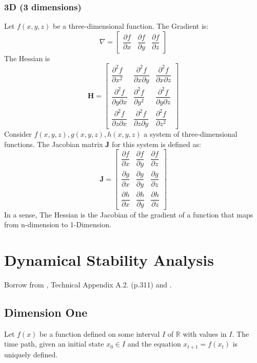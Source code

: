 \documentclass[11pt,a4paper]{book}
\theoremstyle{definition}\newtheorem{definition}{Definition}
\theoremstyle{definition}\newtheorem{fact}{Fact}
\theoremstyle{definition}\newtheorem{remark}{Remark}
\theoremstyle{definition}\newtheorem{ex}{Ex.}
\theoremstyle{definition}\newtheorem{project}{Project}
\theoremstyle{definition}\newtheorem{problem}{Problem}
\theoremstyle{definition}\newtheorem{example}{Example}
\numberwithin{theorem}{section}
\numberwithin{corollary}{chapter}
\numberwithin{assumption}{chapter}
\numberwithin{definition}{chapter}
\numberwithin{prop}{chapter}
\numberwithin{notation}{chapter}
\numberwithin{problem}{chapter}
\numberwithin{example}{chapter}
\numberwithin{fact}{chapter}
\numberwithin{ex}{chapter}
\def\R{\mathbb R}
\def\R{\mathbb R}
\def\H{\mathbf H}
\begin{document}
\begin{appendices}
	\subsection*{3D (3 dimensions)}
	Let \( f(x, y, z) \) be a three-dimensional function. The Gradient is:
	\[
	\nabla =
	\begin{bmatrix}
		\dfrac{\partial f}{\partial x} & \dfrac{\partial f}{\partial y} & \dfrac{\partial f}{\partial z}
	\end{bmatrix}
	\]
	The Hessian is
	\[
	\H = \begin{bmatrix}
		\dfrac{\partial^2 f}{\partial x^2} & \dfrac{\partial^2 f}{\partial x \partial y} & \dfrac{\partial^2 f}{\partial x \partial z} \\
		\dfrac{\partial^2 f}{\partial y \partial x} & \dfrac{\partial^2 f}{\partial y^2} & \dfrac{\partial^2 f}{\partial y \partial z} \\
		\dfrac{\partial^2 f}{\partial z \partial x} & \dfrac{\partial^2 f}{\partial z \partial y} & \dfrac{\partial^2 f}{\partial z^2}
	\end{bmatrix}
	\]	
	Consider $f(x, y, z), g(x, y, z), h(x, y, z)$ a system of three-dimensional functions. The Jacobian matrix \( \mathbf{J} \) for this system is defined as:
	\[
	\mathbf{J} =
	\begin{bmatrix}
		\dfrac{\partial f}{\partial x} & \dfrac{\partial f}{\partial y} & \dfrac{\partial f}{\partial z} \\
		\dfrac{\partial g}{\partial x} & \dfrac{\partial g}{\partial y} & \dfrac{\partial g}{\partial z} \\
		\dfrac{\partial h}{\partial x} & \dfrac{\partial h}{\partial y} & \dfrac{\partial h}{\partial z}
	\end{bmatrix}
	\]
	In a sense, The Hessian is the Jacobian of the gradient of a function that maps from n-dimension to 1-Dimension.
	
	\chapter{Dynamical Stability Analysis} \label{sec:appendix_dyn}
	Borrow from \citet{de2002theory}, Technical Appendix A.2. (p.311) and \citet{dannan2003stability}.
	\section{Dimension One}
	Let $f(x)$ be a function defined on some interval $I$ of $\R$ with values in $I$. The time path, given an initial state $x_0 \in I$ and the equation $x_{t+1} = f(x_t)$ is uniquely defined.
	

\end{appendices}
\end{document}
